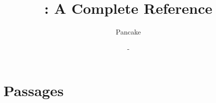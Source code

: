 \documentclass[12pt, a4paper, openright, draft]{memoir}
\begin{document}
\title{\langname : A Complete Reference}
\author{Pancake}
\date{ - \DTMtoday}
\frontmatter
\begin{titlingpage}
  \maketitle
\end{titlingpage}

\begin{KeepFromToc}
  \tableofcontents
\end{KeepFromToc}
\mainmatter





\backmatter
\chapter{Passages}
\end{document}
